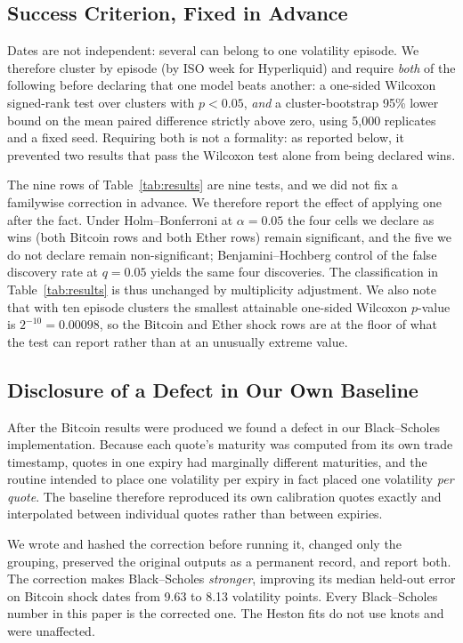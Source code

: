 \documentclass[runningheads]{llncs}
\begin{document}
\subsection{Success Criterion, Fixed in Advance}

Dates are not independent: several can belong to one volatility episode. We
therefore cluster by episode (by ISO week for Hyperliquid) and require
\emph{both} of the following before declaring that one model beats another:
a one-sided Wilcoxon signed-rank test over clusters with $p<0.05$, \emph{and} a
cluster-bootstrap 95\% lower bound on the mean paired difference strictly above
zero, using 5{,}000 replicates and a fixed seed. Requiring both is not a
formality: as reported below, it prevented two results that pass the Wilcoxon
test alone from being declared wins.

The nine rows of Table~\ref{tab:results} are nine tests, and we did not fix a
familywise correction in advance. We therefore report the effect of applying
one after the fact. Under Holm--Bonferroni at $\alpha=0.05$ the four cells we
declare as wins (both Bitcoin rows and both Ether rows) remain significant,
and the five we do not declare remain non-significant; Benjamini--Hochberg
control of the false discovery rate at $q=0.05$ yields the same four
discoveries. The classification in Table~\ref{tab:results} is thus unchanged
by multiplicity adjustment. We also note that with ten episode clusters the
smallest attainable one-sided Wilcoxon $p$-value is $2^{-10}=0.00098$, so the
Bitcoin and Ether shock rows are at the floor of what the test can report
rather than at an unusually extreme value.

\subsection{Disclosure of a Defect in Our Own Baseline}

After the Bitcoin results were produced we found a defect in our
Black--Scholes implementation. Because each quote's maturity was computed from
its own trade timestamp, quotes in one expiry had marginally different
maturities, and the routine intended to place one volatility per expiry in fact
placed one volatility \emph{per quote}. The baseline therefore reproduced its
own calibration quotes exactly and interpolated between individual quotes
rather than between expiries.

We wrote and hashed the correction before running it, changed only the
grouping, preserved the original outputs as a permanent record, and report
both. The correction makes Black--Scholes \emph{stronger}, improving its median
held-out error on Bitcoin shock dates from 9.63 to 8.13 volatility points.
Every Black--Scholes number in this paper is the corrected one. The Heston fits
do not use knots and were unaffected.
\end{document}

